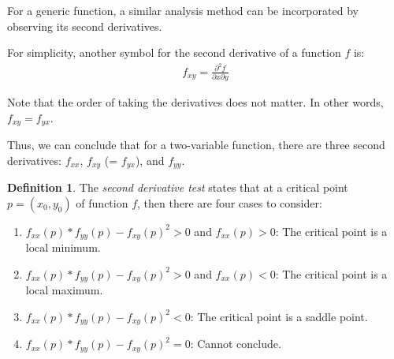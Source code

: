 \documentclass[12pt]{article}
\theoremstyle{definition}
\newtheorem{defn}{Definition}[section]
\begin{document}
	For a generic function, a similar analysis method can be incorporated by observing its second derivatives.
	
	For simplicity, another symbol for the second derivative of a function $f$ is:
	\begin{gather*}
		f_{xy} = \frac{\partial^2 f}{\partial x \partial y}
	\end{gather*}
	
	Note that the order of taking the derivatives does not matter. In other words, $f_{xy} = f_{yx}$.
	
	Thus, we can conclude that for a two-variable function, there are three second derivatives: $f_{xx}$, $f_{xy}$ (= $f_{yx}$), and $f_{yy}$.
	
	\begin{defn}
		The \emph{second derivative test} states that at a critical point $p = (x_0, y_0)$ of function $f$, then there are four cases to consider:
		\begin{enumerate}
			\item $f_{xx}(p) * f_{yy}(p) - f_{xy}(p)^2 > 0$ and $f_{xx}(p) > 0$: The critical point is a local minimum.
			\item $f_{xx}(p) * f_{yy}(p) - f_{xy}(p)^2 > 0$ and $f_{xx}(p) < 0$: The critical point is a local maximum.
			\item $f_{xx}(p) * f_{yy}(p) - f_{xy}(p)^2 < 0$: The critical point is a saddle point.
			\item $f_{xx}(p) * f_{yy}(p) - f_{xy}(p)^2 = 0$: Cannot conclude.
		\end{enumerate}
	\end{defn}
	
\end{document}
